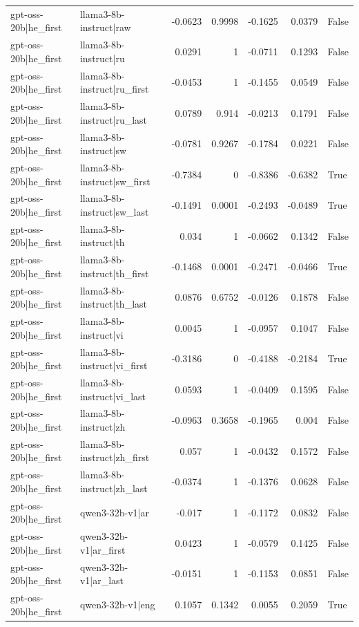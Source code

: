 \begin{table}
\begin{tabular}{l l r r r r l}
gpt-oss-20b|he_first & llama3-8b-instruct|raw & -0.0623 & 0.9998 & -0.1625 & 0.0379 & False \\
gpt-oss-20b|he_first & llama3-8b-instruct|ru & 0.0291 & 1 & -0.0711 & 0.1293 & False \\
gpt-oss-20b|he_first & llama3-8b-instruct|ru_first & -0.0453 & 1 & -0.1455 & 0.0549 & False \\
gpt-oss-20b|he_first & llama3-8b-instruct|ru_last & 0.0789 & 0.914 & -0.0213 & 0.1791 & False \\
gpt-oss-20b|he_first & llama3-8b-instruct|sw & -0.0781 & 0.9267 & -0.1784 & 0.0221 & False \\
gpt-oss-20b|he_first & llama3-8b-instruct|sw_first & -0.7384 & 0 & -0.8386 & -0.6382 & True \\
gpt-oss-20b|he_first & llama3-8b-instruct|sw_last & -0.1491 & 0.0001 & -0.2493 & -0.0489 & True \\
gpt-oss-20b|he_first & llama3-8b-instruct|th & 0.034 & 1 & -0.0662 & 0.1342 & False \\
gpt-oss-20b|he_first & llama3-8b-instruct|th_first & -0.1468 & 0.0001 & -0.2471 & -0.0466 & True \\
gpt-oss-20b|he_first & llama3-8b-instruct|th_last & 0.0876 & 0.6752 & -0.0126 & 0.1878 & False \\
gpt-oss-20b|he_first & llama3-8b-instruct|vi & 0.0045 & 1 & -0.0957 & 0.1047 & False \\
gpt-oss-20b|he_first & llama3-8b-instruct|vi_first & -0.3186 & 0 & -0.4188 & -0.2184 & True \\
gpt-oss-20b|he_first & llama3-8b-instruct|vi_last & 0.0593 & 1 & -0.0409 & 0.1595 & False \\
gpt-oss-20b|he_first & llama3-8b-instruct|zh & -0.0963 & 0.3658 & -0.1965 & 0.004 & False \\
gpt-oss-20b|he_first & llama3-8b-instruct|zh_first & 0.057 & 1 & -0.0432 & 0.1572 & False \\
gpt-oss-20b|he_first & llama3-8b-instruct|zh_last & -0.0374 & 1 & -0.1376 & 0.0628 & False \\
gpt-oss-20b|he_first & qwen3-32b-v1|ar & -0.017 & 1 & -0.1172 & 0.0832 & False \\
gpt-oss-20b|he_first & qwen3-32b-v1|ar_first & 0.0423 & 1 & -0.0579 & 0.1425 & False \\
gpt-oss-20b|he_first & qwen3-32b-v1|ar_last & -0.0151 & 1 & -0.1153 & 0.0851 & False \\
gpt-oss-20b|he_first & qwen3-32b-v1|eng & 0.1057 & 0.1342 & 0.0055 & 0.2059 & True \\

\end{tabular}
\end{table}
